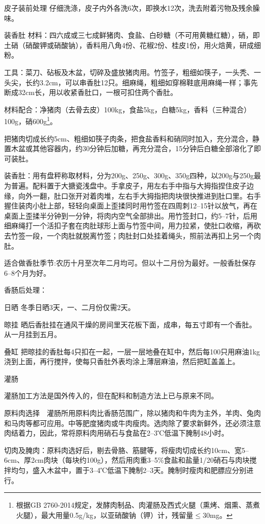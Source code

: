 \documentclass{ctexbook}
\begin{document}
皮子装前处理 仔细洗涤，皮子内外各洗6次，即换水12次，洗去附着污物及残余臊味。

装香肚
材料：四六成或三七成鲜猪肉、食盐、白砂糖（不可用黄糖红糖），硝，即土硝（硝酸钾或硝酸钠），香料用八角4份、花椒2份、桂皮1份，用火焙黄，研成细粉。

工具：菜刀、砧板及木盆，切碎及盛放猪肉用。竹签子，粗细如筷子，一头秃、一头尖，长约3.2cm，可以串香肚12只。细麻绳，粗细如穿棉鞋底用麻绳一样；事先断成32cm长，用以收紧香肚口，一根可扣住两个香肚。

材料配合：净猪肉（去骨去皮）100kg，食盐5kg，白糖5kg，香料（三种混合）100g，硝600g\footnote{根据GB 2760-2014规定，发酵肉制品、肉灌肠及西式火腿（熏烤、烟熏、蒸煮火腿），最大用量0.5g/kg，以亚硝酸钠（钾）计，残留量$\leq$30mg。}。

把猪肉切成长约5cm、粗细如筷子肉条，把食盐香料和硝同时加入，充分混合，静置木盆或其他容器内，约30分钟后加糖，再充分混合，15分钟后白糖全部溶化了即可装肚。

装香肚：用有盘秤称取材料，分为200g、250g、300g、350g四种，以200g与250g最为普遍。配料置于大搪瓷浅盘中。手拿皮子，用左右手中指与大拇指捏住皮子边缘，向外一翻，肚口张开对着肉堆，左右手大拇指把肉块很快推进到肚口里。右手握住装肉小肚上部，轻轻向桌面上歪揉同时用竹签在四周刺12--15针以放气，再在桌面上歪揉半分钟到一分钟，将肉内空气全部排出。用竹签封口，约5--7针，后用细麻绳打一个活扣子套在肉肚球形上面与竹签中间，用力拉紧，使肚口收缩，再砍去竹签一段，一个肉肚就脱离竹签；肉肚封口处挂着绳头，照前法再扣上另一个肉肚。

适合做香肚季节:农历十月至次年二月均可。但以十二月份为最好。一般香肚保存6--8个月为好。

香肠后处理：

日晒 冬季日晒3天，一、二月份仅需2天。

晾挂 晒后香肚挂在通风干燥的房间里天花板下面，成串，每五寸即有一个香肚。从一月挂到五月。

叠缸 把晾挂的香肚每4只扣在一起，一层一层地叠在缸中，然后每100只用麻油1kg浇到上面，再行搅拌，使每只香肚外表均涂上薄层麻油，然后把缸盖盖上。

灌肠

灌肠加工方法是国外传入的，但在配料和制造方法上已与原来不同。

原料肉选择　灌肠所用原料肉比香肠范围广，除以猪肉和牛肉为主外，羊肉、兔肉和马肉等都可应用。中等肥度猪肉或牛肉瘦肉。选肉除了要求新鲜外，还必须注意肉结着力，因此，常将原料肉用硝石与食盐在2--3℃低温下腌制48小时。

切肉及腌肉：原料肉选好后，剔去骨胳、筋腱等，将瘦肉切成长约10cm、宽5--6cm、厚2cm肉块（每块约100g），然后用肉重3--5\%食盐和盐量1/20硝石与肉块搅拌均匀，盛入木盆中，置于3--4℃低温下腌制2--3天。腌制时瘦肉和肥膘应分别进行。
\end{document}
